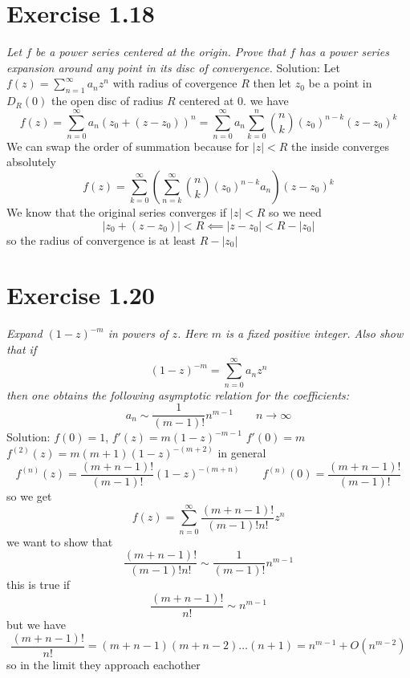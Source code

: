 \documentclass[11pt]{article}
\newcommand{\solution}[1]{{{\textcolor{header}{Solution:} \textcolor{solution}{#1}}}}
\begin{document}
\section{Exercise 1.18}
\emph{
    Let $f$ be a power series centered at the origin. Prove that $f$ has a power series expansion around any point in its disc of convergence.
}
\solution{
    Let $f(z) = \sum_{n=1}^{\infty}a_nz^{n}$ with radius of covergence $R$ then let  $z_0$ be a point in $D_R(0)$ the open disc of radius  $R$ centered at 0. we have
    \[
    f(z) = \sum_{n=0}^{\infty}a_n(z_0 + (z-z_0))^{n} = \sum_{n=0}^{\infty}a_n\sum_{k=0}^{n}\binom{n}{k}(z_0)^{n-k}(z-z_0)^{k}
    \] 
    We can swap the order of summation because for $|z| < R$ the inside converges absolutely
    \[
    f(z) = \sum_{k=0}^{\infty}\left(\sum_{n=k}^{\infty}\binom{n}{k}(z_0)^{n-k}a_n\right)(z-z_0)^{k}
    \] 
    We know that the original series converges if $|z| < R$ so we need
     \[
    |z_0 + (z-z_0)| < R \impliedby |z-z_0| < R - |z_0|
    \] 
    so the radius of convergence is at least $R - |z_0|$
}

\section{Exercise 1.20}
\emph{
    Expand $(1-z)^{-m}$ in powers of $z$. Here $m$ is a fixed positive integer. Also show that if
    \[
        (1-z)^{-m} = \sum_{n=0}^{\infty}a_nz^{n}
    \] 
    then one obtains the following asymptotic relation for the coefficients:
    \[
    a_n \sim \frac{1}{(m-1)!}n^{m-1} \qquad n \rightarrow \infty
    \] 
}
\solution{
    $f(0) = 1$,  $f'(z) = m(1-z)^{-m-1}$ $f'(0) = m$  $f^{(2)}(z) = m(m+1)(1-z)^{-(m+2)}$ 
    in general
    \[
    f^{(n)}(z) = \frac{(m+n-1)!}{(m-1)!}(1-z)^{-(m+n)} \qquad f^{(n)}(0) = \frac{(m+n-1)!}{(m-1)!}
    \] 
    so we get
    \[
    f(z) = \sum_{n=0}^{\infty}\frac{(m+n-1)!}{(m-1)!n!}z^{n}
    \] 
    we want to show that
    \[
        \frac{(m+n-1)!}{(m-1)!n!} \sim \frac{1}{(m-1)!}n^{m-1}
    \] 
    this is true if 
    \[
        \frac{(m+n-1)!}{n!} \sim n^{m-1}
    \] 
    but we have
    \[
        \frac{(m+n-1)!}{n!} = (m+n-1)(m+n-2)\dots(n+1) = n^{m-1} + O(n^{m-2})
    \] 
    so in the limit they approach eachother
}
\end{document}
